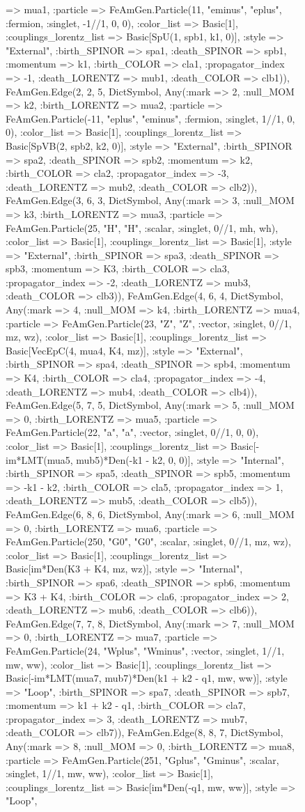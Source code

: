 \documentclass{revtex4}
\begin{document}
\begin{figure}[!htb]
\begin{center}
{=> mua1, :particle => FeAmGen.Particle(11, "eminus", "eplus", :fermion, :singlet, -1//1, 0, 0), :color_list => Basic[1], :couplings_lorentz_list => Basic[SpU(1, spb1, k1, 0)], :style => "External", :birth_SPINOR => spa1, :death_SPINOR => spb1, :momentum => k1, :birth_COLOR => cla1, :propagator_index => -1, :death_LORENTZ => mub1, :death_COLOR => clb1)), FeAmGen.Edge(2, 2, 5, Dict{Symbol, Any}(:mark => 2, :null_MOM => k2, :birth_LORENTZ => mua2, :particle => FeAmGen.Particle(-11, "eplus", "eminus", :fermion, :singlet, 1//1, 0, 0), :color_list => Basic[1], :couplings_lorentz_list => Basic[SpVB(2, spb2, k2, 0)], :style => "External", :birth_SPINOR => spa2, :death_SPINOR => spb2, :momentum => k2, :birth_COLOR => cla2, :propagator_index => -3, :death_LORENTZ => mub2, :death_COLOR => clb2)), FeAmGen.Edge(3, 6, 3, Dict{Symbol, Any}(:mark => 3, :null_MOM => k3, :birth_LORENTZ => mua3, :particle => FeAmGen.Particle(25, "H", "H", :scalar, :singlet, 0//1, mh, wh), :color_list => Basic[1], :couplings_lorentz_list => Basic[1], :style => "External", :birth_SPINOR => spa3, :death_SPINOR => spb3, :momentum => K3, :birth_COLOR => cla3, :propagator_index => -2, :death_LORENTZ => mub3, :death_COLOR => clb3)), FeAmGen.Edge(4, 6, 4, Dict{Symbol, Any}(:mark => 4, :null_MOM => k4, :birth_LORENTZ => mua4, :particle => FeAmGen.Particle(23, "Z", "Z", :vector, :singlet, 0//1, mz, wz), :color_list => Basic[1], :couplings_lorentz_list => Basic[VecEpC(4, mua4, K4, mz)], :style => "External", :birth_SPINOR => spa4, :death_SPINOR => spb4, :momentum => K4, :birth_COLOR => cla4, :propagator_index => -4, :death_LORENTZ => mub4, :death_COLOR => clb4)), FeAmGen.Edge(5, 7, 5, Dict{Symbol, Any}(:mark => 5, :null_MOM => 0, :birth_LORENTZ => mua5, :particle => FeAmGen.Particle(22, "a", "a", :vector, :singlet, 0//1, 0, 0), :color_list => Basic[1], :couplings_lorentz_list => Basic[-im*LMT(mua5, mub5)*Den(-k1 - k2, 0, 0)], :style => "Internal", :birth_SPINOR => spa5, :death_SPINOR => spb5, :momentum => -k1 - k2, :birth_COLOR => cla5, :propagator_index => 1, :death_LORENTZ => mub5, :death_COLOR => clb5)), FeAmGen.Edge(6, 8, 6, Dict{Symbol, Any}(:mark => 6, :null_MOM => 0, :birth_LORENTZ => mua6, :particle => FeAmGen.Particle(250, "G0", "G0", :scalar, :singlet, 0//1, mz, wz), :color_list => Basic[1], :couplings_lorentz_list => Basic[im*Den(K3 + K4, mz, wz)], :style => "Internal", :birth_SPINOR => spa6, :death_SPINOR => spb6, :momentum => K3 + K4, :birth_COLOR => cla6, :propagator_index => 2, :death_LORENTZ => mub6, :death_COLOR => clb6)), FeAmGen.Edge(7, 7, 8, Dict{Symbol, Any}(:mark => 7, :null_MOM => 0, :birth_LORENTZ => mua7, :particle => FeAmGen.Particle(24, "Wplus", "Wminus", :vector, :singlet, 1//1, mw, ww), :color_list => Basic[1], :couplings_lorentz_list => Basic[-im*LMT(mua7, mub7)*Den(k1 + k2 - q1, mw, ww)], :style => "Loop", :birth_SPINOR => spa7, :death_SPINOR => spb7, :momentum => k1 + k2 - q1, :birth_COLOR => cla7, :propagator_index => 3, :death_LORENTZ => mub7, :death_COLOR => clb7)), FeAmGen.Edge(8, 8, 7, Dict{Symbol, Any}(:mark => 8, :null_MOM => 0, :birth_LORENTZ => mua8, :particle => FeAmGen.Particle(251, "Gplus", "Gminus", :scalar, :singlet, 1//1, mw, ww), :color_list => Basic[1], :couplings_lorentz_list => Basic[im*Den(-q1, mw, ww)], :style => "Loop", }
\end{center}
\end{figure}
\end{document}
